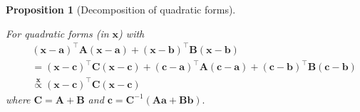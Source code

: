 \documentclass[
  11pt,
  letterpaper,
]{scrbook}
\theoremstyle{definition}
\theoremstyle{plain}
\newtheorem{proposition}{Proposition}[chapter]
\theoremstyle{plain}
\theoremstyle{plain}
\theoremstyle{definition}
\theoremstyle{definition}
\theoremstyle{plain}
\newtheorem{proposition}{Proposition}[chapter]
\theoremstyle{plain}
\theoremstyle{remark}
\begin{document}
\begin{proposition}[Decomposition of quadratic
forms]\protect\hypertarget{prp-quadratic-forms}{}\label{prp-quadratic-forms}

For quadratic forms (in \(\boldsymbol{x}\)) with \begin{align*}
& (\boldsymbol{x} - \boldsymbol{a})^\top \mathbf{A}(\boldsymbol{x} - \boldsymbol{a}) + (\boldsymbol{x} - \boldsymbol{b})^\top \mathbf{B}(\boldsymbol{x} - \boldsymbol{b}) \\\quad &=
 (\boldsymbol{x} - \boldsymbol{c})^\top \mathbf{C}(\boldsymbol{x} - \boldsymbol{c}) + (\boldsymbol{c}-\boldsymbol{a})^\top\mathbf{A}(\boldsymbol{c}-\boldsymbol{a}) + (\boldsymbol{c}-\boldsymbol{b})^\top\mathbf{B}(\boldsymbol{c}-\boldsymbol{b})\\
&\stackrel{\boldsymbol{x}}{\propto} (\boldsymbol{x} - \boldsymbol{c})^\top \mathbf{C}(\boldsymbol{x} - \boldsymbol{c})
\end{align*} where \(\mathbf{C} = \mathbf{A} + \mathbf{B}\) and
\(\boldsymbol{c}= \mathbf{C}^{-1}(\mathbf{A}\boldsymbol{a} + \mathbf{B}\boldsymbol{b}).\)

\end{proposition}
\end{document}
